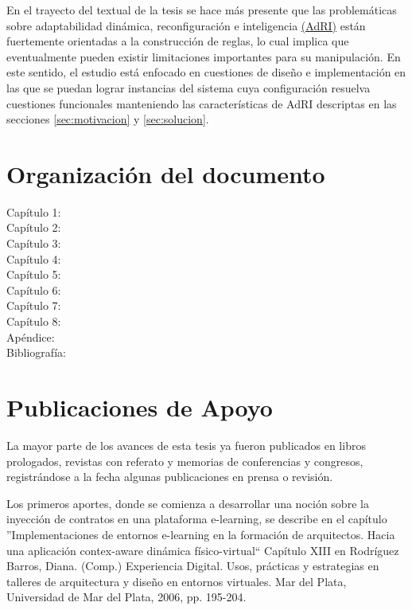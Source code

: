 En el trayecto del textual de la tesis se hace más presente que las problemáticas sobre adaptabilidad dinámica, reconfiguración e inteligencia
\hyperref[AdRI]{(AdRI)} están fuertemente orientadas a la construcción de
reglas, lo cual implica que eventualmente pueden existir limitaciones
importantes para su manipulación. En este sentido, el estudio está enfocado en
cuestiones de diseño e implementación en las que se puedan lograr instancias del
sistema cuya configuración resuelva cuestiones funcionales manteniendo las
características de AdRI descriptas en las secciones \ref{sec:motivacion}
y \ref{sec:solucion}.


\section{Organización del documento}

\begin{description}
 \item[Capítulo 1:]
 \item[Capítulo 2:]
 \item[Capítulo 3:]
 \item[Capítulo 4:]
 \item[Capítulo 5:]
 \item[Capítulo 6:]
 \item[Capítulo 7:]
 \item[Capítulo 8:]
 \item[Apéndice:]
 \item[Bibliografía:]
\end{description}


\section{Publicaciones de Apoyo}

La mayor parte de los avances de esta tesis ya fueron publicados en
libros prologados, revistas con referato y memorias de conferencias y
congresos, registrándose a la fecha algunas publicaciones en prensa o revisión.

Los primeros aportes, donde se comienza a desarrollar una noción
sobre la inyección de contratos en una plataforma e-learning, se describe en
el capítulo ''Implementaciones de entornos e-learning en la formación de
arquitectos. Hacia una aplicación contex-aware dinámica físico-virtual``
Capítulo
XIII en Rodríguez Barros, Diana. (Comp.) Experiencia Digital. Usos, prácticas y
estrategias en talleres de arquitectura y diseño en entornos virtuales. Mar del
Plata, Universidad de Mar del Plata, 2006, pp. 195-204.

